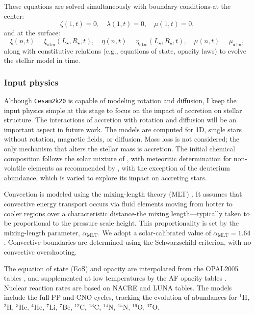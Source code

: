 \documentclass[12pt,a4paper]{article}
\newcommand{\mr}{\mathrm}
\begin{document}
These equations are solved simultaneously with boundary conditions-at the center:
\begin{equation}
  \zeta(1, t) = 0,\quad \lambda(1, t) =0, \quad \mu(1, t) = 0,
\end{equation}
and at the surface:
\begin{equation}
  \xi(n, t) = \xi_\mr{atm}(L_\star, R_\star, t),\quad \eta(n, t) = \eta_\mr{atm}(L_\star, R_\star, t),\quad \mu(n, t) = \mu_\mr{atm},
\end{equation}
along with constitutive relations (e.g., equations of state, opacity laws) to evolve the stellar model in time.

\subsubsection{Input physics}
\label{sec:cesam2k20_input_physics}

Although \texttt{Cesam2k20} is capable of modeling rotation and diffusion, I keep the input physics simple at this stage to focus on the impact of accretion on stellar structure. The interactions of accretion with rotation and diffusion will be an important aspect in future work. The models are computed for 1D, single stars without rotation, magnetic fields, or diffusion. Mass loss is not considered; the only mechanism that alters the stellar mass is accretion. The initial chemical composition follows the solar mixture of \textcite{AsplundEtAl2009}, with meteoritic determination for non-volatile elements as recommended by \textcite{SerenelliEtAl2009}, with the exception of the deuterium abundance, which is varied to explore its impact on accreting stars.

Convection is modeled using the mixing-length theory (MLT) \parencite{CoxGiuli1968a}. It assumes that convective energy transport occurs via fluid elements moving from hotter to cooler regions over a characteristic distance-the mixing length—typically taken to be proportional to the pressure scale height. This proportionality is set by the mixing-length parameter, $\alpha_\mathrm{MLT}$. We adopt a solar-calibrated value of $\alpha_\mathrm{MLT} = 1.64$. Convective boundaries are determined using the Schwarzschild criterion, with no convective overshooting.

The equation of state (EoS) and opacity are interpolated from the OPAL2005 tables \parencite{RogersIglesias1992,IglesiasRogers1996,RogersNayfonov2002}, and supplemented at low temperatures by the AF opacity tables \parencite{FergusonEtAl2005}. Nuclear reaction rates are based on NACRE \parencite{AikawaEtAl2006} and LUNA \parencite{BrogginiEtAl2018} tables. The models include the full PP and CNO cycles, tracking the evolution of abundances for $^{1}\mr{H}$, $^{2}\mr{H}$, $^{3}\mr{He}$, $^{4}\mr{He}$, $^{7}\mr{Li}$, $^{7}\mr{Be}$, $^{12}\mr{C}$, $^{13}\mr{C}$, $^{14}\mr{N}$, $^{15}\mr{N}$, $^{16}\mr{O}$, $^{17}\mr{O}$.
\end{document}
